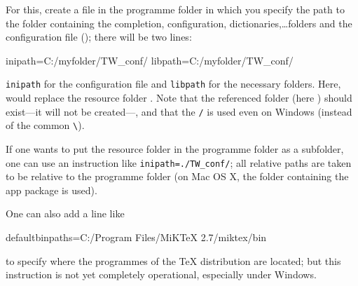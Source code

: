 For this, create a file  in the programme folder in which you specify the path to the folder containing the completion, configuration, dictionaries,\dots folders and the configuration file (); there will be two lines:
\begin{verbExample}
inipath=C:/myfolder/TW_conf/
libpath=C:/myfolder/TW_conf/
\end{verbExample}

\verb+inipath+ for the configuration file and \verb+libpath+ for the necessary folders. Here,  would replace the resource folder . Note that the referenced folder (here ) should exist---it will not be created---, and that the \verb|/| is used even on Windows (instead of the common \verb+\+).

If one wants to put the resource folder in the programme folder as a subfolder, one can use an instruction like \verb+inipath=./TW_conf/+; all relative paths are taken to be relative to the {\Tw} programme folder (on Mac OS X, the folder containing the app package is used).

One can also add a line like
\begin{verbExample}
defaultbinpaths=C:/Program Files/MiKTeX 2.7/miktex/bin
\end{verbExample}
to specify where the programmes of the {\TeX} distribution are located; but this instruction is not yet completely operational, especially under Windows.
